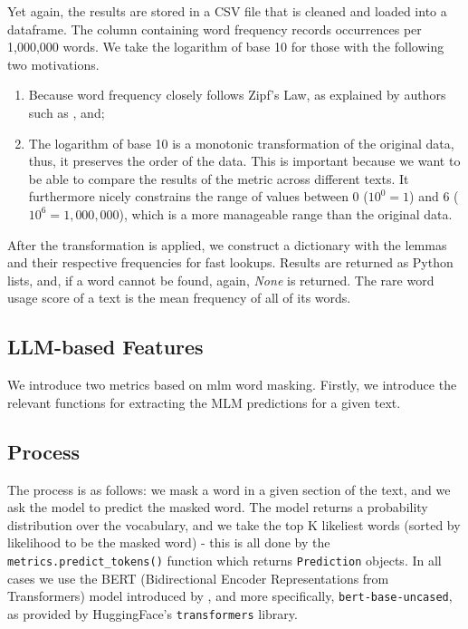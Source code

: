 \begin{description}
    Yet again, the results are stored in a CSV file that is cleaned and loaded into a dataframe. The column containing word frequency records occurrences per 1,000,000 words. We take the logarithm of base 10 for those with the following two motivations. 
    \begin{enumerate}
        \item Because word frequency closely follows Zipf's Law, as explained by authors such as \cite{powers1998zipf}, and;
        \item The logarithm of base 10 is a monotonic transformation of the original data, thus, it preserves the order of the data. This is important because we want to be able to compare the results of the metric across different texts. It furthermore nicely constrains the range of values between 0 ($10^0=1$) and 6 ($10^6=1,000,000$), which is a more manageable range than the original data.
    \end{enumerate}

    After the transformation is applied, we construct a dictionary with the lemmas and their respective frequencies for fast lookups. Results are returned as Python lists, and, if a word cannot be found, again, \textit{None} is returned. The rare word usage score of a text is the mean frequency of all of its words.
\end{description}


\subsection{LLM-based Features}
We introduce two metrics based on \acrfull{mlm} word masking. Firstly, we introduce the relevant functions for extracting the MLM predictions for a given text.

\subsection*{Process}

The process is as follows: we mask a word in a given section of the text, and we ask the model to predict the masked word. The model returns a probability distribution over the vocabulary, and we take the top K likeliest words (sorted by likelihood to be the masked word) - this is all done by the \texttt{metrics.predict\_tokens()} function which returns \texttt{Prediction} objects. In all cases we use the BERT (Bidirectional Encoder Representations from Transformers) model introduced by \cite*{devlin2019bert}, and more specifically, \texttt{bert-base-uncased}, as provided by HuggingFace's \texttt{transformers} library. 
    
